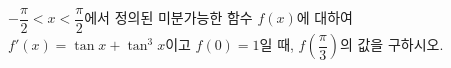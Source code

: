 $-\dfrac{\pi}{2}<x<\dfrac{\pi}{2}$에서 정의된 미분가능한 함수 $f(x)$에 대하여 $f'(x)=\tan x+\tan^3 x$이고 $f(0)=1$일 때, $f\!\left(\dfrac{\pi}{3}\right)$의 값을 구하시오.
